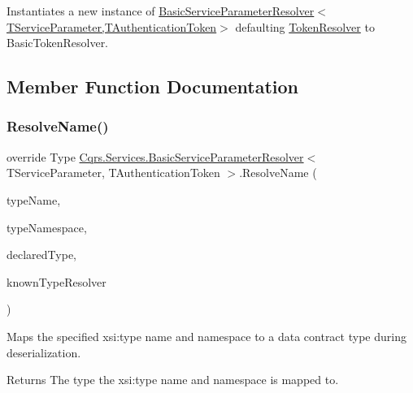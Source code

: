 Instantiates a new instance of \hyperlink{classCqrs_1_1Services_1_1BasicServiceParameterResolver_af82f43a2f64aa5c33a3692a2a689367b_af82f43a2f64aa5c33a3692a2a689367b}{Basic\+Service\+Parameter\+Resolver$<$\+T\+Service\+Parameter,\+T\+Authentication\+Token$>$} defaulting \hyperlink{classCqrs_1_1Services_1_1BasicServiceParameterResolver_a0ed208048d0f925dfa1e14fb73d82f0b_a0ed208048d0f925dfa1e14fb73d82f0b}{Token\+Resolver} to Basic\+Token\+Resolver. 



\subsection{Member Function Documentation}
\mbox{\label{classCqrs_1_1Services_1_1BasicServiceParameterResolver_a8c598f2f49a83190c315afc88e5630d5_a8c598f2f49a83190c315afc88e5630d5}} 
\subsubsection{\texorpdfstring{Resolve\+Name()}{ResolveName()}}
{\footnotesize\ttfamily override Type \hyperlink{classCqrs_1_1Services_1_1BasicServiceParameterResolver}{Cqrs.\+Services.\+Basic\+Service\+Parameter\+Resolver}$<$ T\+Service\+Parameter, T\+Authentication\+Token $>$.Resolve\+Name (\begin{DoxyParamCaption}\item[{string}]{type\+Name,  }\item[{string}]{type\+Namespace,  }\item[{Type}]{declared\+Type,  }\item[{Data\+Contract\+Resolver}]{known\+Type\+Resolver }\end{DoxyParamCaption})}



Maps the specified xsi\+:type name and namespace to a data contract type during deserialization. 

\begin{DoxyReturn}{Returns}
The type the xsi\+:type name and namespace is mapped to. 
\end{DoxyReturn}

